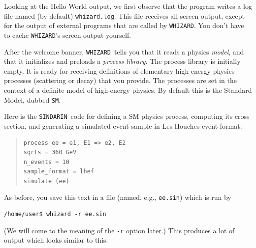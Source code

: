 \documentclass[12pt]{book}
\newcommand{\ttt}[1]{\texttt{#1}}
\newcommand{\whizard}{\ttt{WHIZARD}}
\newcommand{\sindarin}{\ttt{SINDARIN}}
\begin{document}
Looking at the Hello World output, we first observe that the program
writes a log file named (by default) \verb|whizard.log|.  This file
receives all screen output, except for the output of external programs
that are called by \whizard.  You don't have to cache \whizard's screen
output yourself.

After the welcome banner, \whizard\ tells you that it reads a physics
\emph{model}, and that it initializes and preloads a \emph{process library}.  The
process library is initially empty.  It is ready for receiving
definitions of elementary high-energy physics processes (scattering or
decay) that you provide.  The processes are set in the context of a
definite model of high-energy physics.  By default this is the
Standard Model, dubbed \verb|SM|.

Here is the \sindarin\ code for defining a SM physics process, computing
its cross section, and generating a simulated event sample in Les Houches
event format:
\begin{quote}
\begin{Verbatim}
process ee = e1, E1 => e2, E2
sqrts = 360 GeV
n_events = 10
sample_format = lhef
simulate (ee)
\end{Verbatim}
\end{quote}
As before, you save this text in a file (named, e.g.,
\verb|ee.sin|) which is run by
\begin{verbatim}
/home/user$ whizard -r ee.sin
\end{verbatim}
(We will come to the meaning of the \verb|-r| option later.)
This produces a lot of output which looks similar to this:
\end{document}
